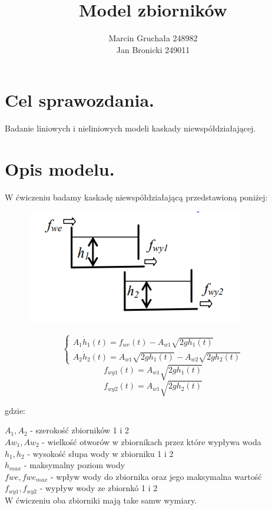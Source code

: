 \documentclass{article}
\title{Model zbiorników}
\author{Marcin Gruchała 248982\\
Jan Bronicki 249011\\}
\date{}
\begin{document}
\maketitle

\section{Cel sprawozdania.}
Badanie liniowych i nieliniowych modeli kaskady niewspółdziałającej.
\section{Opis modelu.}
W ćwiczeniu badamy kaskadę niewspółdziałającą przedstawioną poniżej:

\begin{figure}[h]
    \centering
    \includegraphics{obrazek_zbiornikow.png}
    \label{fig:my_label}
\end{figure}
$$
\begin{cases}
    A_1\dot h_{1}(t)=f_{we}(t)-A_{w1}\sqrt{2gh_1(t)}\\
    A_2\dot h_{2}(t)=A_{w1}\sqrt{2gh_1(t)}-A_{w2}\sqrt{2gh_2(t)}
  \end{cases}
$$
$$
f_{wy1}(t)=A_{w1}\sqrt{2gh_1(t)}
$$
$$
f_{wy2}(t)=A_{w1}\sqrt{2gh_2(t)}
$$

\begin{flushleft}
gdzie:
\end{flushleft}
$ A_1, A_2 $ - szerokość zbiorników 1 i 2\\
$Aw_1, Aw_2$ - wielkość otworów w zbiornikach przez które wypływa woda\\
$h_1, h_2$ - wysokość słupa wody w zbiorniku 1 i 2\\
$h_{max}$ - maksymalny poziom wody \\
$fwe, fwe_{max}$ - wpływ wody do zbiornika oraz jego maksymalna wartość\\
$f_{wy1}, f_{wy2}$ - wypływ wody ze zbiornkó 1 i 2 \\
W ćwiczeniu oba zbiorniki mają take samw wymiary.
\end{document}
